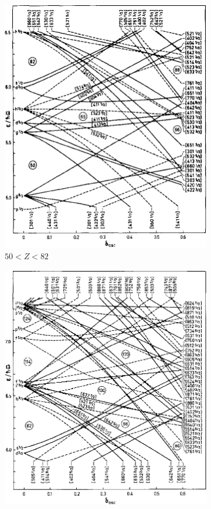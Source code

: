 \documentclass[10pt,a4paper, twoside]{report}
\begin{document}
\begin{figure}
\centering
\begin{subfigure}[b]{0.45\textwidth}
    \includegraphics[width=\textwidth]{./figures/Nilsson/proton_deformed50.png}
    \caption{$50<Z<82$}
\end{subfigure}	
\quad
\begin{subfigure}[b]{0.45\textwidth}
    \includegraphics[width=\textwidth]{./figures/Nilsson/proton_deformed82.png}

\end{subfigure}
\end{figure}
\end{document}
